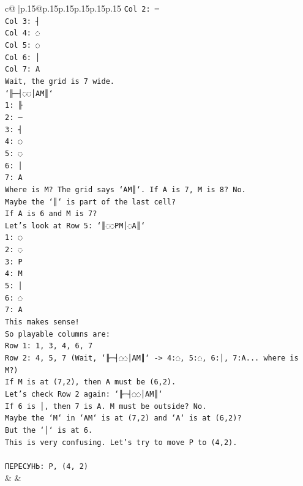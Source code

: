 \documentclass{article}
\begin{document}
{\begin{supertabular}{c@{$\;$}|p{.15\linewidth}@{}p{.15\linewidth}p{.15\linewidth}p{.15\linewidth}p{.15\linewidth}p{.15\linewidth}}
{{{\texttt{Col 2: ─} \\
\texttt{Col 3: ┤} \\
\texttt{Col 4: ◌} \\
\texttt{Col 5: ◌} \\
\texttt{Col 6: │} \\
\texttt{Col 7: A} \\
\texttt{Wait, the grid is 7 wide.} \\
\texttt{`╟─┤◌◌│AM║`} \\
\texttt{1: ╟} \\
\texttt{2: ─} \\
\texttt{3: ┤} \\
\texttt{4: ◌} \\
\texttt{5: ◌} \\
\texttt{6: │} \\
\texttt{7: A} \\
\texttt{Where is M? The grid says `AM║`. If A is 7, M is 8? No.} \\
\texttt{Maybe the `║` is part of the last cell?} \\
\texttt{If A is 6 and M is 7?} \\
\texttt{Let's look at Row 5: `║◌◌PM│◌A║`} \\
\texttt{1: ◌} \\
\texttt{2: ◌} \\
\texttt{3: P} \\
\texttt{4: M} \\
\texttt{5: │} \\
\texttt{6: ◌} \\
\texttt{7: A} \\
\texttt{This makes sense!} \\
\texttt{So playable columns are:} \\
\texttt{Row 1: 1, 3, 4, 6, 7} \\
\texttt{Row 2: 4, 5, 7 (Wait, `╟─┤◌◌│AM║` {-}> 4:◌, 5:◌, 6:│, 7:A... where is M?)} \\
\texttt{If M is at (7,2), then A must be (6,2).} \\
\texttt{Let's check Row 2 again: `╟─┤◌◌│AM║`} \\
\texttt{If 6 is │, then 7 is A. M must be outside? No.} \\
\texttt{Maybe the `M` in `AM` is at (7,2) and `A` is at (6,2)?} \\
\texttt{But the `│` is at 6.} \\
\texttt{This is very confusing. Let's try to move P to (4,2).} \\
\\ 
\texttt{ПЕРЕСУНЬ: P, (4, 2)} \\
            }
        }
    }
    & & \\ \\


\end{supertabular}}
\end{document}
